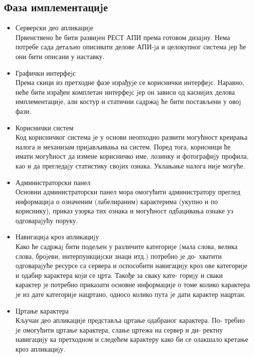 \documentclass[a4paper]{article}
\begin{document}
\subsection{Фаза имплементациjе}
\begin{itemize}
\item Серверски део апликациjе\\
Првенствено ће бити развиjен РЕСТ АПИ према готовом дизаjну.
Нема потребе сада детаљно описивати делове АПИ-jа и целокупног
система jер ће они бити описани у наставку.

\item Графички интерфеjс\\
Према скици из претходне фазе израђуjе се кориснички интерфеjс.
Наравно, неће бити израђен комплетан интерфеjс jер он зависи од
касниjих делова имплементациjе, али костур и статични садржаj ће
бити постављени у овоj фази.

\item Кориснички систем\\
Код корисничког система jе у основи неопходно развити могућност
креирања налога и механизам приjављивања на систем. Поред тога,
корисници ће имати могућност да измене корисничко име, лозинку и
фотографиjу профила, као и да прегледаjу статистику своjих ознака.
Уклањање налога ниjе могуће.

\item Администраторски панел\\
Основни администраторски панел мора омогућити администратору
преглед информациjа о означеним (лабелираним) карактерима (укупно
и по кориснику), приказ узорка тих ознака и могућност одбацивања
ознаке уз одговараjућу поруку.

\item Навигациjа кроз апликациjу\\
Како ће садржаj бити подељен у различите категориjе (мала слова,
велика слова, броjеви, интерпункциjски знаци итд.) потребно jе до-
хватити одговараjуће ресурсе са сервера и оспособити навигациjу кроз
ове категориjе и одабир карактера коjи се црта. Такође за сваку кате-
гориjу и сваки карактер jе потребно приказати основне информациjе о
томе колико карактера jе из дате категориjе нацртано, односо колико
пута jе дати карактер нацртан.

\item Цртање карактера\\
Кључан део апликациjе представља цртање одабраног карактера. По-
требно jе омогућити цртање карактера, слање цртежа на сервер и ди-
ректну навигациjу ка претходном и следећем карактеру како би се
олакшало кретање кроз апликациjу.
\end{itemize}
\end{document}
